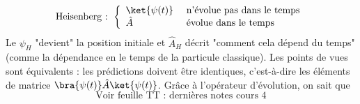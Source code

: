 	\begin{equation}
	\text{Heisenberg : }\left\{\begin{array}{ll}
	\ket{\psi(t)} & \text{ n'évolue pas dans le temps}\\
	\hat{A} & \text{ évolue dans le temps}	
	\end{array}\right.
	\end{equation}	
	Le $\psi_H$ "devient" la position initiale et $\hat{A}_H$ décrit "comment cela dépend du temps" 
	(comme la dépendance en le temps de la particule classique). Les points de vues sont équivalents : 
	les prédictions doivent être identiques, c'est-à-dire les éléments de matrice 
	$\bra{\psi(t)}\hat{A}\ket{\psi(t)}$. Grâce à l'opérateur d'évolution, on sait que
	\begin{equation}
	\text{Voir feuille TT : dernières notes cours 4}
	\end{equation}
 
 
 
 
 
 
 
 
 
 
 
 
 
 
 
 
 
 